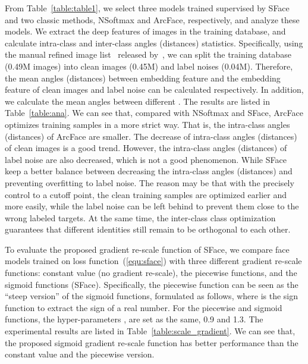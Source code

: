 \documentclass[journal,comsoc]{IEEEtran}
\begin{document}
From Table~\ref{table:table1}, we select three models trained supervised by SFace and two classic methods, NSoftmax and ArcFace, respectively, and analyze these models. We extract the deep features of images in the training database, and calculate intra-class and inter-class angles (distances) statistics. Specifically, using the manual refined image list~\cite{rwebface_wang} released by~\cite{wang2017normface}, we can split the training database (0.49M images) into clean images (0.45M) and label noises (0.04M). Therefore, the mean angles (distances) between embedding feature  and the embedding feature  of clean images and label noise can be calculated respectively. In addition, we calculate the mean angles between different . The results are listed in Table~\ref{table:ana}. We can see that, compared with NSoftmax and SFace, ArcFace optimizes training samples in a more strict way. That is, the intra-class angles (distances) of ArcFace are smaller. The decrease of intra-class angles (distances) of clean images is a good trend. However, the intra-class angles (distances) of label noise are also decreased, which is not a good phenomenon. While SFace keep a better balance between decreasing the intra-class angles (distances) and preventing overfitting to label noise. The reason may be that with the precisely control to a cutoff point, the clean training samples are optimized earlier and more easily, while the label noise can be left behind to prevent them close to the wrong labeled targets. At the same time, the inter-class class optimization guarantees that different identities still remain to be orthogonal to each other. 

To evaluate the proposed gradient re-scale function of SFace, we compare face models trained on loss function~(\ref{equ:sface}) with three different gradient re-scale functions: constant value (no gradient re-scale), the piecewise functions, and the sigmoid functions (SFace). Specifically, the piecewise function can be seen as the ``steep version'' of the sigmoid functions, formulated as follows, 
where  is the sign function to extract the sign of a real number. For the piecewise and sigmoid functions, the hyper-parameters ,  are set as the same, 0.9 and 1.3. The experimental results are listed in Table~\ref{table:scale_gradient}. We can see that, the proposed sigmoid gradient re-scale function has better performance than the constant value and the piecewise version. 
\end{document}

